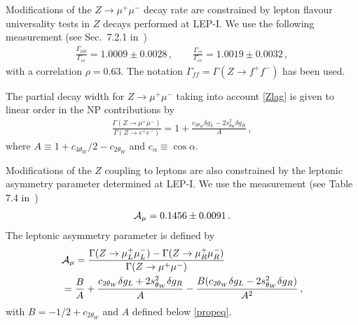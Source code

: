\documentclass[aps,twocolumn,showpacs,preprintnumbers,amsmath,amssymb,floatfix,nofootinbib]{revtex4-1}
\begin{document}
Modifications of the $Z \to \mu^+ \mu^-$ decay rate are constrained by lepton flavour universality tests in $Z$ decays performed at LEP-I.    We use the following measurement (see Sec.~7.2.1 in~\cite{ALEPH:2005ab})
%
\begin{align}    \label{zdec}
\frac{\Gamma_{\mu \mu}}{ \Gamma_{ee} }  = 1.0009 \pm 0.0028 \,, \qquad  \frac{\Gamma_{\tau \tau}}{ \Gamma_{ee} }  = 1.0019 \pm 0.0032 \,,
\end{align}
%
with a correlation $\rho = 0.63$.  The notation $\Gamma_{ff} = \Gamma(Z \to f^+ f^-)$ has been used.  


The partial decay width for $Z \to \mu^+ \mu^-$ taking into account \eqref{Zlag} is given to linear order in the NP contributions by
%
\begin{align}  \label{propeq}
\frac{\Gamma(Z \to \mu^+ \mu^-)}{\Gamma(Z \to e^+ e^-)}  = 1 +  \frac{    c_{2 \theta_W}  \delta g_L    -  2  s_{\theta_W}^2 \delta g_R    }{A  }  \,,
 \end{align}
where $A \equiv 1  +  c_{4 \theta_W}/2-  c_{2 \theta_W} $ and  $c_\alpha \equiv \cos \alpha$.      

Modifications of the $Z$ coupling to leptons are also constrained by the leptonic asymmetry parameter determined at LEP-I. We use the measurement (see Table 7.4 in~\cite{ALEPH:2005ab})
%
\begin{align}  \label{Amuexp}
{\cal{A}}_{\mu} = 0.1456 \pm 0.0091 \,.
\end{align}
%
The leptonic asymmetry parameter is defined by
\begin{align}
&{\cal{A}}_{\mu}  =   \frac{   \Gamma(Z \to \mu_L^+ \mu_L^- ) -       \Gamma(Z \to \mu_R^+ \mu_R^- )  }{   \Gamma(Z \to \mu^+ \mu^- )   }  \, \nonumber  \\
 &= \frac{B}{A}  +  \frac{ c_{2 \theta_W} \delta g_L    + 2 s_{\theta_W}^2  \delta g_R}{A}   -  \frac{B(c_{2 \theta_W} \delta g_L    -  2 s_{\theta_W}^2  \delta g_R )}{A^2}    \,,
\end{align}
% 
with $B =   - 1/2   + c_{2 \theta_W}$ and $A$ defined below \eqref{propeq}.     
\end{document}
